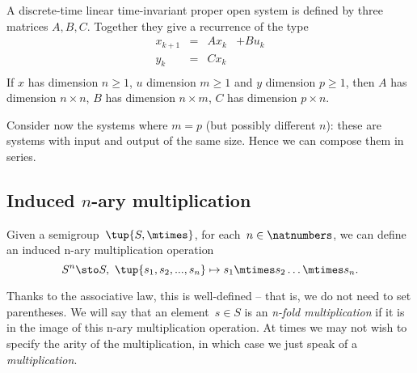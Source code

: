 \begin{example}
  \label{ex:discrete-time-linear}
  \begin{definition}
    A discrete-time linear time-invariant proper open system is defined by three matrices $A,B,C$.
    Together they give a recurrence of the type
    \begin{equation}
      \begin{aligned}
        x_{k+1} &=& A x_k & + B u_k \\
        y_{k}   &=& C x_k  \\
      \end{aligned}
    \end{equation}
    If $x$ has dimension $n\geq1$, $u$ dimension $m\geq1$ and $y$ dimension $p\geq1$, then
    $A$ has dimension $n \times n$, $B$ has dimension $n \times m$, $C$ has dimension
    $p \times n$.
  \end{definition}

  Consider now the systems where $m=p$ (but possibly different $n$): these are systems with
  input and output of the same size. Hence we can compose them in series.




\end{example}

\subsection{Induced $n$-ary multiplication}
Given a semigroup~$\tup{S, \mtimes}$, for each~$n \in \natnumbers$, we can define an induced n-ary multiplication operation
\begin{equation*}
  S^n \sto S, \ \tup{s_1, s_2, ..., s_n} \mapsto s_1 \mtimes s_2 \dots \mtimes s_n.
\end{equation*}


Thanks to the associative law, this is well-defined -- that is, we do not need to set parentheses.
We will say that an element~$s \in S$ is an \emph{n-fold multiplication} if it is in the image of this n-ary multiplication operation.
At times we may not wish to specify the arity of the multiplication, in which case we just speak of a \emph{multiplication}.
